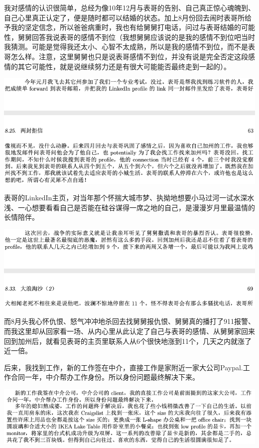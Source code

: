 \documentclass[9pt, b5paper]{article}
\begin{document}
我对感情的认识很简单，总经为像10年12月与表哥的告别、自己真正惊心魂魄到、自己心里真正认定了，便是随时都可以结婚的状态。加上8月份回去闹时表哥所给予我的坚定信念，所以爸爸病重时，我也有给舅舅打电话，问过与表哥结婚的可能性，舅舅回答我说表哥的感情不到位（我想舅舅应该说的是我的感情不到位吧当时我猜测。可能是觉得我还太小、心智不太成熟，所以是我的感情不到位，而不是表哥怎么样。注意，这里舅舅也只是说表哥感情不到位，并没有说是完全否定这段感情的其它可能性，就是说继续努力还是有很大可能能否最终走到一起的）。

\begin{center}
\includegraphics[width=.9\linewidth]{./pic/p1p63-1.png}
\end{center}

表哥的LinkedIn主页，对当年那个怀揣大城市梦、执拗地想要小马过河一试水深水浅、一心想要看看自己是否能在硅谷谋得一席之地的自己，是漫漫岁月里最温情的长情陪伴。

\begin{center}
\includegraphics[width=.9\linewidth]{./pic/p1p69-1.png}
\end{center}

而8月头我心怀仇恨、怒气冲冲地杀回去找舅舅报仇恨、舅舅真的播打了911报警、而我这里却从回家看一场、从内心里从此认定了自己与表哥的感情、从舅舅家回来回到加州后，就看见表哥的主页里联系人从6个很快地涨到11个，几天之内就涨了近一倍。 

后来，我找到工作，新的工作签在中介，直接工作是家附近一家大公司Paypal.工作合同一年，中介帮办工作身份。所以身份问题最终解决下来。 

\begin{center}
\includegraphics[width=.9\linewidth]{./pic/p1p102.png}
\end{center}
\end{document}
